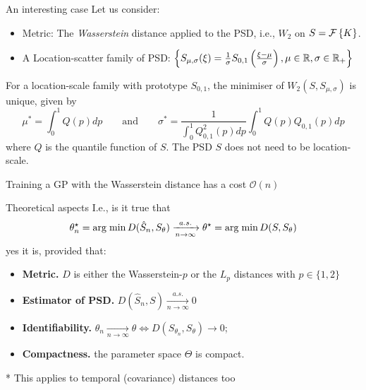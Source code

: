 \documentclass[pdf,aspectratio=169,10pt]{beamer}
\begin{document}
\begin{frame}[plain]{An interesting case}
    Let us consider: 
        \begin{itemize}
        \item Metric: The \textit{Wasserstein} distance applied to the PSD, i.e., $W_2$ on $S=\mathcal{F} \left\{K\right\}$.
        \item A Location-scatter family of PSD: $  \left\{S_{\mu,\sigma}(\xi) = \frac{1}{\sigma} S_{0,1} \left(\frac{\xi-\mu}{\sigma}\right), \mu\in{\mathbb{R}},\sigma\in{\mathbb{R}}_+\right\}$ 
    \end{itemize}
    \begin{theorem} 
\label{thm:convexWF}
For a  location-scale family with prototype $S_{0,1}$, the minimiser of $W_2(S, S_{\mu,\sigma})$ is unique, given by 
\begin{equation}
  \mu^* = \int_0^1 Q(p)d p \qquad \mbox{and} \qquad
  \sigma^* = \frac{1}{\int_0^1 Q_{0,1}^2(p)d p}\int_0^1 Q(p) Q_{0,1}(p)d p \label{eq:soln_mu_sigma}
\end{equation}
where $Q$ is the quantile function of $S$. The PSD $S$ does not need to be location-scale.
\end{theorem}
 Training a GP with the Wasserstein distance has a cost $\mathcal{O}(n)$
\end{frame}




\begin{frame}[plain]{Theoretical aspects}
     I.e., is it true that
    \begin{equation}
        \theta_n^\star = \mathop{\rm arg \; min}\limits D(\hat S_n, S_\theta) \xrightarrow[n \to \infty]{a.s.} \theta^\star = \mathop{\rm arg \; min}\limits D(S, S_\theta)
    \end{equation}
    yes it is, provided that: 
    \vspace{1em}
    \begin{itemize}
        \item \textbf{Metric.} $D$ is either the Wasserstein-$p$ or the $L_p$ distances with $p\in\{1,2\}$
        \item \textbf{Estimator of PSD.} $D(\hat S_{n}, S)\xrightarrow [n\to \infty]{a.s.} 0$
        \item \textbf{Identifiability.} $\theta_n\xrightarrow[n\to \infty]{} \theta \iff D(S_{\theta_n}, S_\theta)\to 0$; 
        \item \textbf{Compactness.} the parameter space  $\Theta$ is compact.
    \end{itemize}

    \vspace{2em}
    \flushright ** This applies to temporal (covariance) distances too


\end{frame}
\end{document}
